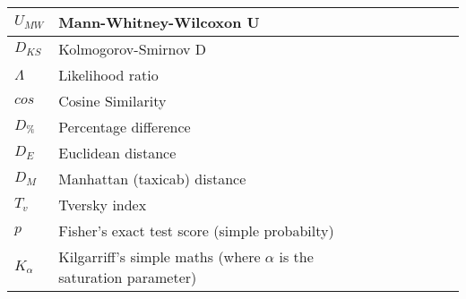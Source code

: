 \documentclass[11pt]{article}
\begin{document}
\begin{landscape}
\begin{longtable}{|l|l|l|l|l|l|l|l|l|}
$U_{MW}$            & Mann-Whitney-Wilcoxon U\\ \hline
$D_{KS}$            & Kolmogorov-Smirnov D\\ \hline
$\Lambda$           & Likelihood ratio\\ \hline
$cos$               & Cosine Similarity\\ \hline
$D_\%$              & Percentage difference \\ \hline
$D_E$               & Euclidean distance\\ \hline
$D_M$               & Manhattan (taxicab) distance\\ \hline
$T_v$               & Tversky index\\ \hline
$p$                 & Fisher's exact test score (simple probabilty)\\ \hline
$K_{\alpha}$        & Kilgarriff's simple maths (where $\alpha$ is the saturation parameter)\\ \hline

\end{longtable}

\end{landscape}








\end{document}
